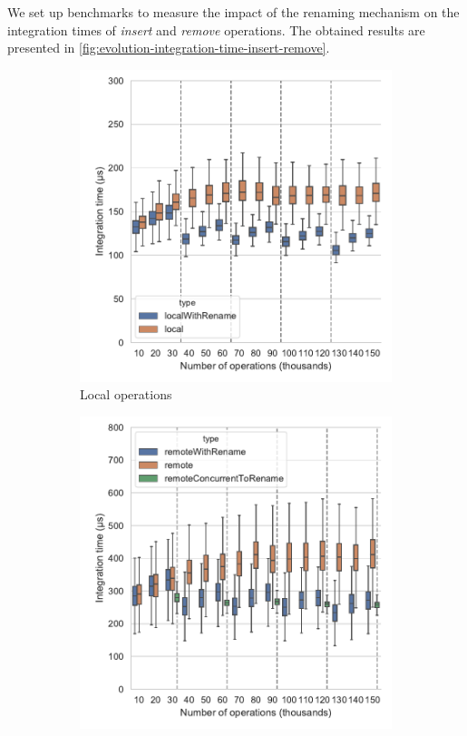 \documentclass[sigplan,10pt]{acmart}
\begin{document}
We set up benchmarks to measure the impact of the renaming mechanism on the integration times of \emph{insert} and \emph{remove} operations.
The obtained results are presented in \autoref{fig:evolution-integration-time-insert-remove}.

\begin{figure}
    \centering
    \begin{subfigure}{\columnwidth}
        \includegraphics[width=0.9\columnwidth]{img/integration-time-boxplot-local-operations-without-outliers.pdf}
        \caption{Local operations}
        \label{fig:evolution-integration-time-local-insert-remove}
    \end{subfigure}
    \begin{subfigure}{\columnwidth}
        \includegraphics[width=0.9\columnwidth]{img/integration-time-boxplot-remote-operations-without-outliers.pdf}

\end{subfigure}
\end{figure}
\end{document}
